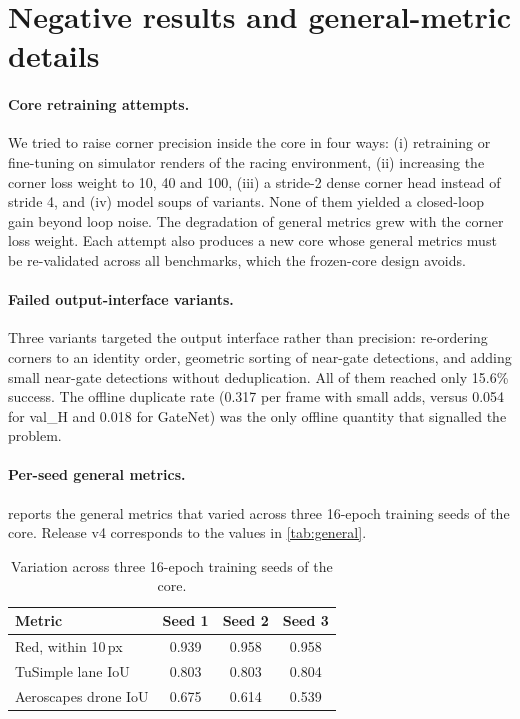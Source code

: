 \documentclass[10pt,twocolumn,letterpaper]{article}
\begin{document}
\section{Negative results and general-metric details}
\label{sec:app_neg}
\paragraph{Core retraining attempts.}
We tried to raise corner precision inside the core in four ways: (i) retraining or fine-tuning on simulator renders of the racing environment, (ii) increasing the corner loss weight to 10, 40 and 100, (iii) a stride-2 dense corner head instead of stride 4, and (iv) model soups of variants. None of them yielded a closed-loop gain beyond loop noise. The degradation of general metrics grew with the corner loss weight. Each attempt also produces a new core whose general metrics must be re-validated across all benchmarks, which the frozen-core design avoids.

\paragraph{Failed output-interface variants.}
Three variants targeted the output interface rather than precision: re-ordering corners to an identity order, geometric sorting of near-gate detections, and adding small near-gate detections without deduplication. All of them reached only 15.6\% success. The offline duplicate rate (0.317 per frame with small adds, versus 0.054 for val\_H and 0.018 for GateNet) was the only offline quantity that signalled the problem.

\paragraph{Per-seed general metrics.}
 reports the general metrics that varied across three 16-epoch training seeds of the core. Release v4 corresponds to the values in \cref{tab:general}.

\begin{table}[h]
  \centering
  \small
  \begin{tabular}{@{}lccc@{}}
    \toprule
    Metric & Seed 1 & Seed 2 & Seed 3 \\
    \midrule
    Red, within 10\,px & 0.939 & 0.958 & 0.958 \\
    TuSimple lane IoU & 0.803 & 0.803 & 0.804 \\
    Aeroscapes drone IoU & 0.675 & 0.614 & 0.539 \\
    \bottomrule
  \end{tabular}
  \caption{Variation across three 16-epoch training seeds of the core.}
  \label{tab:seeds}
\end{table}
\end{document}
